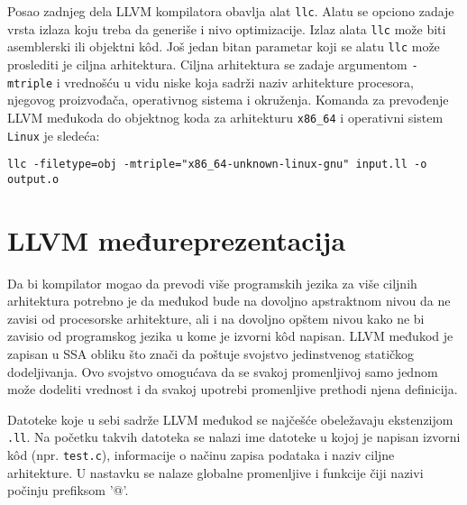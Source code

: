 \documentclass[12pt,oneside]{memoir}
\begin{document}
Posao zadnjeg dela LLVM kompilatora obavlja alat \texttt{llc}. Alatu se opciono zadaje
vrsta izlaza koju treba da generiše i nivo optimizacije. Izlaz alata \texttt{llc} može biti asemblerski ili objektni k\^od. Još jedan bitan parametar koji se alatu \texttt{llc} može proslediti je ciljna arhitektura. Ciljna arhitektura se zadaje argumentom \texttt{-mtriple} i vrednošću u vidu niske koja sadrži naziv arhitekture procesora, njegovog proizvođača, operativnog sistema i okruženja. Komanda za prevođenje LLVM međukoda do objektnog koda za
arhitekturu \texttt{x86\_64} i operativni sistem \texttt{Linux} je sledeća:

\begin{verbatim}
llc -filetype=obj -mtriple="x86_64-unknown-linux-gnu" input.ll -o output.o 
\end{verbatim}

\section{LLVM međureprezentacija}
\label{sec:llvm_ir}

Da bi kompilator mogao da prevodi više programskih jezika za više ciljnih arhitektura potrebno je da međukod bude na dovoljno apstraktnom nivou da ne zavisi od procesorske arhitekture, ali i na dovoljno opštem nivou kako ne bi zavisio od programskog jezika u kome je izvorni k\^od napisan. LLVM međukod je zapisan u SSA obliku što znači da poštuje svojstvo jedinstvenog statičkog dodeljivanja. Ovo svojstvo omogućava da se svakoj promenljivoj samo jednom može dodeliti vrednost i da svakoj upotrebi promenljive prethodi njena definicija. 

Datoteke koje u sebi sadrže LLVM međukod se najčešće obeležavaju ekstenzijom \texttt{.ll}. Na početku takvih datoteka se nalazi ime datoteke u kojoj je napisan izvorni kôd (npr. \texttt{test.c}), informacije o načinu zapisa podataka i naziv ciljne arhitekture. U nastavku se nalaze globalne promenljive i funkcije čiji nazivi počinju prefiksom ’@’.
\end{document}
